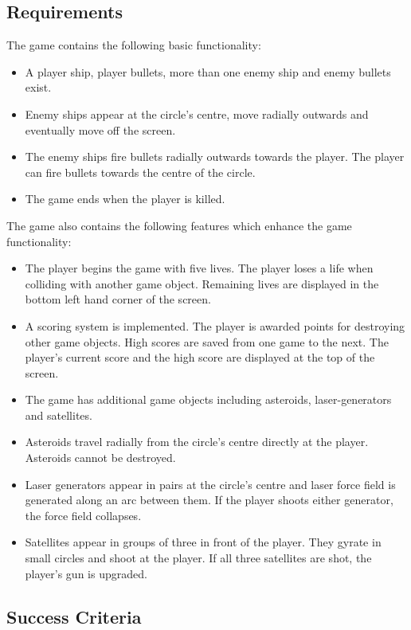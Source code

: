 \documentclass[10pt,twocolumn]{witseiepaper}
\begin{document}
\subsection{Requirements}

The game contains the following basic functionality:

\begin{itemize}
	\item A player ship, player bullets, more than one enemy ship and enemy bullets exist.
	\item Enemy ships appear at the circle's centre, move radially outwards and eventually move off the screen. 
	\item The enemy ships fire bullets radially outwards towards the player. The player can fire bullets towards the centre of the circle.
	\item The game ends when the player is killed.
\end{itemize}

The game also contains the following features which enhance the game functionality:

\begin{itemize}
	\item The player begins the game with five lives. The player loses a life when colliding with another game object. Remaining lives are displayed in the bottom left hand corner of the screen.
	\item A scoring system is implemented. The player is awarded points for destroying other game objects. High scores are saved from one game to the next. The player's current score and the high score are displayed at the top of the screen.
	\item The game has additional game objects including asteroids, laser-generators and satellites.
	\item Asteroids travel radially from the circle's centre directly at the player. Asteroids cannot be destroyed.
	\item Laser generators appear in pairs at the circle's centre and laser force field is generated along an arc between them. If the player shoots either generator, the force field collapses.
	\item Satellites appear in groups of three in front of the player. They gyrate in small circles and shoot at the player. If all three satellites are shot, the player's gun is upgraded.
	
\end{itemize}


\subsection{Success Criteria}
\end{document}
